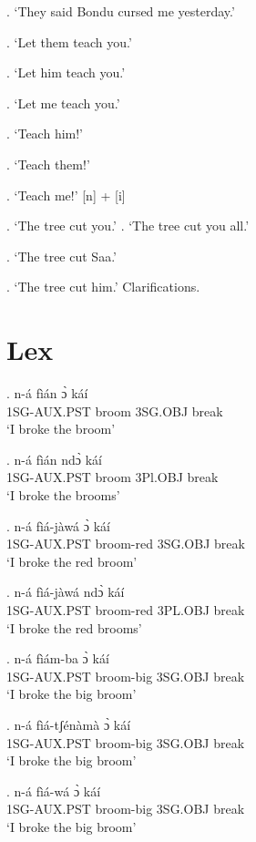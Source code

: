 \documentclass{assets/fieldnotes}
\begin{document}
{\ex. `They said Bondu cursed me yesterday.'


\ex. `Let them teach you.'

\ex. `Let him teach you.'

\ex. `Let me teach you.'

\ex. `Teach him!'

\ex. `Teach them!'

\ex. `Teach me!'
[n] + [i]

\ex. `The tree cut you.'
\ex. `The tree cut you all.'

\ex. `The tree cut Saa.'

\ex. `The tree cut him.'
Clarifications.


\section{Lex}


\exg. n-á fìán ɔ̀ káí\\
1SG-AUX.PST broom    3SG.OBJ break\\
`I broke the broom'

\exg. n-á fìán ndɔ̀ káí\\
1SG-AUX.PST broom   3Pl.OBJ break\\
`I broke the brooms'

\exg. n-á fìá-jàwá ɔ̀ káí\\
1SG-AUX.PST broom-red 3SG.OBJ break\\
`I broke the red broom'

\exg. n-á fìá-jàwá ndɔ̀ káí\\
1SG-AUX.PST broom-red 3PL.OBJ break\\
`I broke the red brooms'

\exg. n-á fìám-ba ɔ̀ káí\\
1SG-AUX.PST broom-big 3SG.OBJ break\\
`I broke the big broom'

\exg. n-á fìá-tʃénàmà ɔ̀ káí\\
1SG-AUX.PST broom-big 3SG.OBJ break\\
`I broke the big broom'

\exg. n-á fìá-wá ɔ̀ káí\\
1SG-AUX.PST broom-big 3SG.OBJ break\\
`I broke the big broom'

}
\end{document}
